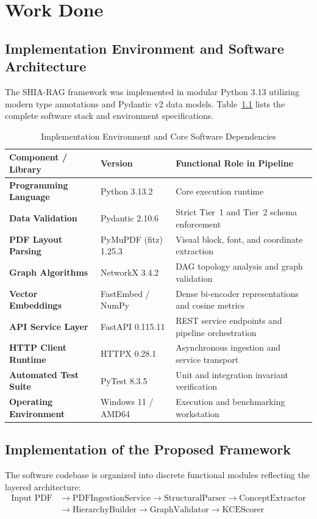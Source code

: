 \documentclass[12pt,a4paper]{report}
\begin{document}
\chapter{Work Done}

\section{Implementation Environment and Software Architecture}
The SHIA-RAG framework was implemented in modular Python 3.13 utilizing modern type annotations and Pydantic v2 data models. Table~\ref{tab:env_stack} lists the complete software stack and environment specifications.

\begin{table}[h!]
\centering
\caption{Implementation Environment and Core Software Dependencies}
\label{tab:env_stack}
\begin{tabular}{p{4.2cm}p{2.6cm}p{6.8cm}}
\hline
\textbf{Component / Library} & \textbf{Version} & \textbf{Functional Role in Pipeline} \\ \hline
\textbf{Programming Language} & Python 3.13.2 & Core execution runtime \\
\textbf{Data Validation} & Pydantic 2.10.6 & Strict Tier~1 and Tier~2 schema enforcement \\
\textbf{PDF Layout Parsing} & PyMuPDF (fitz) 1.25.3 & Visual block, font, and coordinate extraction \\
\textbf{Graph Algorithms} & NetworkX 3.4.2 & DAG topology analysis and graph validation \\
\textbf{Vector Embeddings} & FastEmbed / NumPy & Dense bi-encoder representations and cosine metrics \\
\textbf{API Service Layer} & FastAPI 0.115.11 & REST service endpoints and pipeline orchestration \\
\textbf{HTTP Client Runtime} & HTTPX 0.28.1 & Asynchronous ingestion and service transport \\
\textbf{Automated Test Suite} & PyTest 8.3.5 & Unit and integration invariant verification \\
\textbf{Operating Environment} & Windows 11 / AMD64 & Execution and benchmarking workstation \\
\hline
\end{tabular}
\end{table}

\section{Implementation of the Proposed Framework}
The software codebase is organized into discrete functional modules reflecting the layered architecture:
\begin{align*}
\text{Input PDF} &\longrightarrow \text{PDFIngestionService} \longrightarrow \text{StructuralParser} \longrightarrow \text{ConceptExtractor} \\
&\longrightarrow \text{HierarchyBuilder} \longrightarrow \text{GraphValidator} \longrightarrow \text{KCEScorer}
\end{align*}
\end{document}
